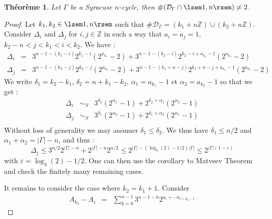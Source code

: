 \documentclass[12pt,a4paper]{article}
\newtheorem{theo}{Théorème}
\def\ZZ{\mathbb{Z}}
\def\D{\mathcal{D}}
\begin{document}
\begin{theo}\label{theo:syracuse_cycle} Let $\Gamma$ be a Syracuse $n$-cycle, then $\#(\D_\Gamma\cap \lsem 1,n\rsem)\neq 2$.
\end{theo}
\begin{proof} Let $k_1,k_2\in\lsem 1,n\rsem$ such that $\#\D_\Gamma=(k_1+n\ZZ)\cup(k_2+n\ZZ)$.  Consider $\Delta_i$ and $\Delta_j$ for $i,j\in \ZZ$ in such a way that $a_i=a_j=1$, $k_2-n< j<k_1<i < k_2$. 
We have : 
\begin{eqnarray}
\Delta_i&=&  3^{n-1-(k_1-i)}2^{k_1-i}\left(2^{a_{k_1}}-2\right)
	+3^{n-1-(k_2-i)}2^{k_2-i+a_{k_1}-1}\left(2^{a_{k_2}}-2\right)\\
\Delta_j&=&  3^{n-1-(k_2-j)}2^{k_2-j}\left(2^{a_{k_2}}-2\right)
+3^{n-1-(k_1+n-j)}2^{k_1+n-j+a_{k_2}-1}\left(2^{a_{k_1}}-2\right)
\end{eqnarray} 
We write $\delta_1 = k_2-k_1 $, $\delta_2 = n+k_1-k_2$, $\alpha_1 = a_{k_1}-1$ et $\alpha_2=a_{k_2}-1$ so that we get : 
\begin{eqnarray}
\Delta_i&\sim_S&  3^{\delta_2}\left(2^{\alpha_1}-1\right)
	+2^{\delta_2+\alpha_1}\left(2^{\alpha_2}-1\right)\\
\Delta_j&\sim_S&  3^{\delta_1}\left(2^{\alpha_2}-1\right)
	+2^{\delta_1+\alpha_2}\left(2^{\alpha_1}-1\right)\\
\end{eqnarray} 
Without loss of generality we may assumer $\delta_1\leq\delta_2$. We thus have $\delta_1\leq n/2$ and $\alpha_1+\alpha_2 = |\Gamma|-n$, and thus : 
$$ \Delta_j \leq 3^{n/2}2^{|\Gamma|-n}+ 2^{|\Gamma|-n}2^{n/2}\leq 2^{|\Gamma|-(\log_3(2)-1/2)|\Gamma|}\leq 2^{|\Gamma|(1-\varepsilon)}$$
with $\varepsilon=\log_3(2)-1/2$.
One can then use the corollary to Matveev Theorem and check the finitely many remaining cases.

It remains to consider the case where $k_2=k_1+1$. 
Consider
\begin{eqnarray}
A_{k_2}-A_i &=& \sum_{k=0}^{n-1}3^{n-1-k}2^{a_i+\cdots a_{i+k_2-1}}
\end{eqnarray}

\end{proof}
\end{document}
